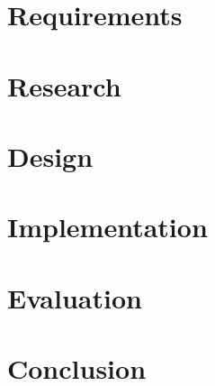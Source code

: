 \documentclass{l3proj}
\begin{document}



\chapter{Requirements}
\label{requirements}


\chapter{Research}
\label{research}




\chapter{Design}
\label{design}



\chapter{Implementation}
\label{implementation}



\chapter{Evaluation}
\label{evaluation}



\chapter{Conclusion}
\label{conclusion}
\end{document}
